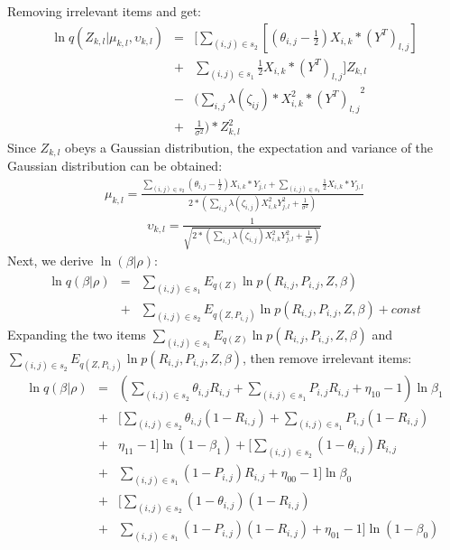 \documentclass[conference]{IEEEtran}
\begin{document}
Removing irrelevant items and get:
\begin{eqnarray*}
    \ln q(Z_{k,l}|\mu_{k,l},\upsilon_{k,l})&=&[\sum_{(i,j)\in s_2}[(\theta_{i,j}-\frac{1}{2})X_{i,k}*(Y^{T})_{l,j}]\\
    &+& \sum_{(i,j)\in s_1}\frac{1}{2}X_{i,k}*(Y^{T})_{l,j}]Z_{k,l}\\
    &-&(\sum_{i,j}\lambda(\zeta_{ij})*X^{2}_{i,k}*{(Y^{T})_{l,j}}^{2} \\
    &+&\frac{1}{\sigma^{2}})*Z^{2}_{k,l}
\end{eqnarray*}
Since $Z_{k,l}$ obeys a Gaussian distribution, the expectation and variance of the Gaussian distribution can be obtained:
\begin{eqnarray*}
\mu_{k,l} = \frac{\sum_{(i,j)\in s_2}(\theta_{i,j}-\frac{1}{2})X_{i,k}*Y_{j,l}+\sum_{(i,j)\in s_1}\frac{1}{2}X_{i,k}*Y_{j,l}}{2*(\sum_{i,j}\lambda(\zeta_{i,j})X^{2}_{i,k}Y_{j,l}^{2}+\frac{1}{\sigma^2})}
\end{eqnarray*}
\begin{eqnarray*}
\upsilon_{k,l} = \frac{1}{\sqrt{2*(\sum_{i,j}\lambda(\zeta_{i,j})X^{2}_{i,k}Y_{j,l}^{2}+\frac{1}{\sigma^2})}}
\end{eqnarray*}
Next, we derive $\ln(\beta|\rho)$:
\begin{eqnarray*}
    \ln q(\beta|\rho) 
    &=& \sum_{(i,j)\in s_1}E_{q(Z)}{\ln p(R_{i,j},P_{i,j},Z,\beta)}  \nonumber \\ 
    &+& \sum_{(i,j)\in s_2}E_{q(Z,P_{i,j})}{\ln p(R_{i,j},P_{i,j},Z,\beta)} + const
\end{eqnarray*}
Expanding the two items $\sum_{(i,j)\in s_1}E_{q(Z)}{\ln p(R_{i,j},P_{i,j},Z,\beta)}$ and $\sum_{(i,j)\in s_2}E_{q(Z,P_{i,j})}{\ln p(R_{i,j},P_{i,j},Z,\beta)}$, then remove irrelevant items: 
\begin{eqnarray*}
    \ln q(\beta|\rho) &=& (\sum_{(i,j)\in s_2}\theta _{i,j}R_{i,j} + \sum_{(i,j)\in s_1}P_{i,j}R_{i,j} +\eta_{10}-1)\ln{\beta_{1}}\\
    &+&[\sum_{(i,j)\in s_2}\theta_{i,j} (1-R_{i,j}) + \sum_{(i,j)\in s_1}P_{i,j}(1-R_{i,j})\\
    &+&\eta_{11}-1]\ln(1-\beta_{1})
    +[\sum_{(i,j)\in s_2}(1-\theta_{i,j})R_{i,j} \\
    &+& \sum_{(i,j)\in s_1}(1-P_{i,j})R_{i,j}  +\eta_{00}-1]\ln{\beta_0} \\
    &+&[\sum_{(i,j)\in s_2}(1-\theta_{i,j})(1-R_{i,j})\\ 
    &+& \sum_{(i,j)\in s_1}(1-P_{i,j})(1-R_{i,j}) +\eta_{01}-1]\ln(1-\beta_{0})
\end{eqnarray*}
\end{document}
